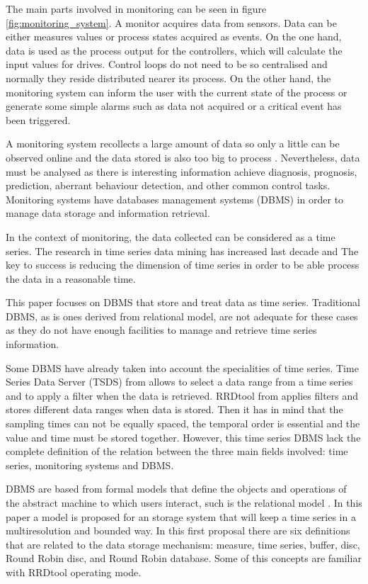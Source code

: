 


The main parts involved in monitoring can be seen in figure \ref{fig:monitoring_system}. A monitor acquires data from sensors. Data can be either measures values or process states acquired as events. 
On the one hand, data is used as the process output for the controllers, which will calculate the input values for drives. Control loops do not need to be so centralised and normally they reside distributed nearer its process.
On the other hand, the monitoring system can inform the user with the current state of the process or generate some simple alarms such as data not acquired or a critical event has been triggered. 

A monitoring system recollects a
large amount of data so only a little can be observed online and the
data stored is also too big to process \parencite{keogh97}. Nevertheless, data must be analysed as there is interesting information achieve  diagnosis, prognosis, prediction, aberrant behaviour detection, and other common control tasks. Monitoring systems have databases management systems (DBMS) in order to manage data storage and information retrieval. 


In the context of monitoring, the data collected can be considered as a time
series. The research in time series data mining has
increased last decade \parencite{fu11} and  The key to success is
reducing the dimension of time series in order to be able process the
data in a reasonable time.

This paper focuses on DBMS that store and treat data as time series.
Traditional DBMS, as is ones derived from relational model, are not adequate for these cases as they do not have enough facilities to manage and retrieve time series information. 

Some DBMS have already taken into account the
specialities of time series.  Time Series Data Server (TSDS) from
\textcite{weigel10} allows to select a data range from a time series and
to apply a filter when the data is retrieved.  RRDtool from
\textcite{rrdtool} applies filters and stores different data ranges when
data is stored. Then it has in mind that the sampling times can not be
equally spaced, the temporal order is essential and the value and time
must be stored together. However, this time series DBMS lack the complete definition of the relation between the three main fields involved: time series, monitoring systems and DBMS.


DBMS are based from formal models that define
the objects and operations of the abstract machine to which users
interact, such is the relational model \parencite{date}. In this paper
a model is proposed for an storage system that will keep a time series
in a multiresolution and bounded way.  In this first proposal there
are six definitions that are related to the data storage mechanism:
measure, time series, buffer, disc, Round Robin disc, and Round Robin
database. Some of this concepts are familiar with RRDtool
operating mode.





